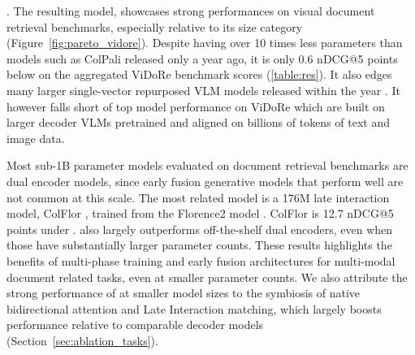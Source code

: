 \noindent\textbf{\colflagship{}}. The resulting model, \colflagship{} showcases strong performances on visual document retrieval benchmarks, especially relative to its size category (Figure~\ref{fig:pareto_vidore}). Despite having over 10 times less parameters than models such as ColPali released only a year ago, it is only 0.6 nDCG@5 points below on the aggregated ViDoRe benchmark scores (\autoref{table:res}). It also edges many larger single-vector repurposed VLM models released within the year \citep{chen2025mocamodalityawarecontinualpretraining, jiang2024e5vuniversalembeddingsmultimodal, jiang2025vlm2vectrainingvisionlanguagemodels}. It however falls short of top model performance on ViDoRe which are built on larger decoder VLMs pretrained and aligned on billions of tokens of text and image data.

Most sub-1B parameter models evaluated on document retrieval benchmarks are dual encoder models, since early fusion generative models that perform well are not common at this scale. The most related model is a 176M late interaction model, ColFlor \citep{masrycolflor}, trained from the Florence2 model \citep{xiao2023florence2advancingunifiedrepresentation}. ColFlor is 12.7 nDCG@5 points under \colflagship{}. \colflagship{} also largely outperforms off-the-shelf dual encoders, even when those have substantially larger parameter counts. 
These results highlights the benefits of multi-phase training and early fusion architectures for multi-modal document related tasks, even at smaller parameter counts. We also attribute the strong performance of \colflagship{} at smaller model sizes to the symbiosis of native bidirectional attention and Late Interaction matching, which largely boosts performance relative to comparable decoder models (Section~\ref{sec:ablation_tasks}).


